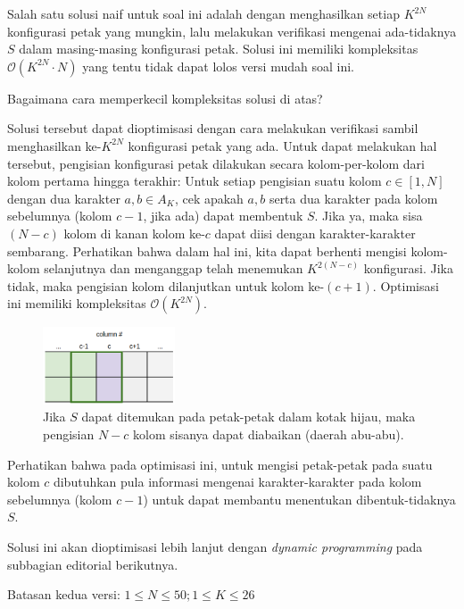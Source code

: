 \documentclass[../main_editorial.tex]{subfiles} %
\newcommand{\bigO}[1]{\mathcal{O}(#1)}
\begin{document}
Salah satu solusi naif untuk soal ini adalah dengan menghasilkan setiap $K^{2N}$ konfigurasi petak yang mungkin, lalu melakukan verifikasi mengenai ada-tidaknya $ S $ dalam masing-masing konfigurasi petak. Solusi ini memiliki kompleksitas $ \bigO{K^{2N}\cdot N} $ yang tentu tidak dapat lolos versi mudah soal ini.

Bagaimana cara memperkecil kompleksitas solusi di atas?

Solusi tersebut dapat dioptimisasi dengan cara melakukan verifikasi sambil menghasilkan ke-$ K^{2N} $ konfigurasi petak yang ada. Untuk dapat melakukan hal tersebut, pengisian konfigurasi petak dilakukan secara kolom-per-kolom dari kolom pertama hingga terakhir: Untuk setiap pengisian suatu kolom $ c \in [1, N] $ dengan dua karakter $ a, b \in A_K $, cek apakah $ a, b $ serta dua karakter pada kolom sebelumnya (kolom $ c - 1 $, jika ada) dapat membentuk $ S $. Jika ya, maka sisa $ (N-c) $ kolom di kanan kolom ke-$ c $ dapat diisi dengan karakter-karakter sembarang. Perhatikan bahwa dalam hal ini, kita dapat berhenti mengisi kolom-kolom selanjutnya dan menganggap telah menemukan $ K^{2(N-c)} $ konfigurasi. Jika tidak, maka pengisian kolom dilanjutkan untuk kolom ke-$ (c + 1) $. Optimisasi ini memiliki kompleksitas $ \bigO{K^{2N}} $.

\begin{figure}[!h]
	\centering
	\includegraphics[width=0.35\textwidth]{scrabble/imgs/scrabble-per-column}
		\captionsetup{width=0.8\textwidth}
	\caption{Jika $ S $ dapat ditemukan pada petak-petak dalam kotak hijau, maka pengisian $ N-c $ kolom sisanya dapat diabaikan (daerah abu-abu).}
\end{figure}

Perhatikan bahwa pada optimisasi ini, untuk mengisi petak-petak pada suatu kolom $ c $ dibutuhkan pula informasi mengenai karakter-karakter pada kolom sebelumnya (kolom $ c - 1 $) untuk dapat membantu menentukan dibentuk-tidaknya $ S $.

Solusi ini akan dioptimisasi lebih lanjut dengan \textit{dynamic programming} pada subbagian editorial berikutnya.

Batasan kedua versi: $1 \le N \le 50; 1 \le K \le 26$
\end{document}
